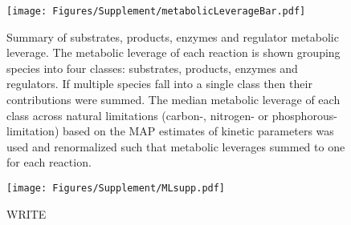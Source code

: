 \documentclass[12pt]{article}\usepackage{graphicx, color}
\begin{document}


\begin{figure}[h!]
\texttt{[image: Figures/Supplement/metabolicLeverageBar.pdf]}
\caption{Summary of substrates, products, enzymes and regulator metabolic leverage.  The metabolic leverage of each reaction is shown grouping species into four classes: substrates, products, enzymes and regulators. If multiple species fall into a single class then their contributions were summed. The median metabolic leverage of each class across natural limitations (carbon-, nitrogen- or phosphorous-limitation) based on the MAP estimates of kinetic parameters was used and renormalized such that metabolic leverages summed to one for each reaction.}
\label{fig:MLbar}
\end{figure}

\begin{figure}[h!]
\texttt{[image: Figures/Supplement/MLsupp.pdf]}
\caption{WRITE}
\label{fig:MLpathways}
\end{figure}
\end{document}
